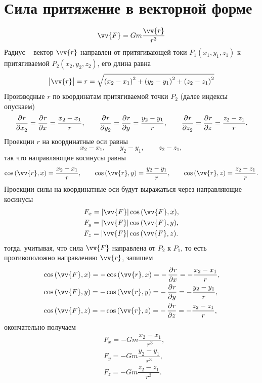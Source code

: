 \documentclass[11pt, a4paper]{article}
\theoremstyle{plain}
\theoremstyle{definition}
\theoremstyle{remark}
\begin{document}
\section{Сила притяжение в векторной форме}
\begin{equation*}
    \vv{F} = Gm\dfrac{\vv{r}}{r^3}
\end{equation*}
Радиус -- вектор $\vv{r}$ направлен от притягивающей токи $P_1 (x_1, y_1, z_1)$ к притягиваемой $P_2
(x_2, y_2, z_2)$, его длина равна
\begin{equation*}
    \left| \vv{r}\right| = r = \sqrt{\left( x_2 - x_1 \right)^2 +
    \left( y_2 - y_1 \right)^2 + \left( z_2 - z_1 \right)^2}
\end{equation*}
Производные $r$ по координатам притягиваемой точки $P_2$ (далее индексы опускаем)
\begin{equation*}
    \dpd{r}{x_2} = \dpd{r}{x} = \dfrac{x_2 - x_1}{r},\qquad
    \dpd{r}{y_2} = \dpd{r}{y} =  \dfrac{y_2 - y_1}{r},\qquad
    \dpd{r}{z_2} = \dpd{r}{z} = \dfrac{z_2 - z_1}{r}. 
\end{equation*}
Проекции $r$ на координатные оси равны
\begin{equation*}
    x_2 - x_1,\qquad y_2 - y_1, \qquad z_2 - z_1,
\end{equation*}
так что направляющие косинусы равны
\begin{equation*}
    \cos{(\vv{r}, x)} = \dfrac{x_2 - x_1}{r},\qquad \cos{(\vv{r}, y)} = \dfrac{y_2 - y_1}{r},\qquad
    \cos{(\vv{r}, z)} = \dfrac{z_2 - z_1}{r}.
\end{equation*}
Проекции силы на координатные оси будут выражаться через направляющие косинусы
\begin{align*}
    & F_x = |\vv{F}|\cos{(\vv{F}, x)}, \\
    & F_y = |\vv{F}|\cos{(\vv{F}, y)}, \\
    & F_z = |\vv{F}|\cos{(\vv{F}, z)}. 
\end{align*}
тогда, учитывая, что сила $\vv{F}$ направлена от $P_2$ к $P_1$, то есть противоположно направлению
$\vv{r}$, запишем
\begin{align*}
    & \cos{(\vv{F}, x)} = -\cos{(\vv{r}, x)} = -\dpd{r}{x} = -\dfrac{x_2 - x_1}{r}, \\
    & \cos{(\vv{F}, y)} = -\cos{(\vv{r}, y)} = -\dpd{r}{y} = -\dfrac{y_2 - y_1}{r}, \\
    & \cos{(\vv{F}, z)} = -\cos{(\vv{r}, z)} = -\dpd{r}{z} = -\dfrac{z_2 - z_1}{r}, 
\end{align*}
окончательно получаем
\begin{align*}
    & F_x = -Gm \dfrac{x_2 - x_1}{r^3}, \\
    & F_y = -Gm \dfrac{y_2 - y_1}{r^3}, \\
    & F_z = -Gm \dfrac{z_2 - z_1}{r^3}. \\
\end{align*}
\end{document}
